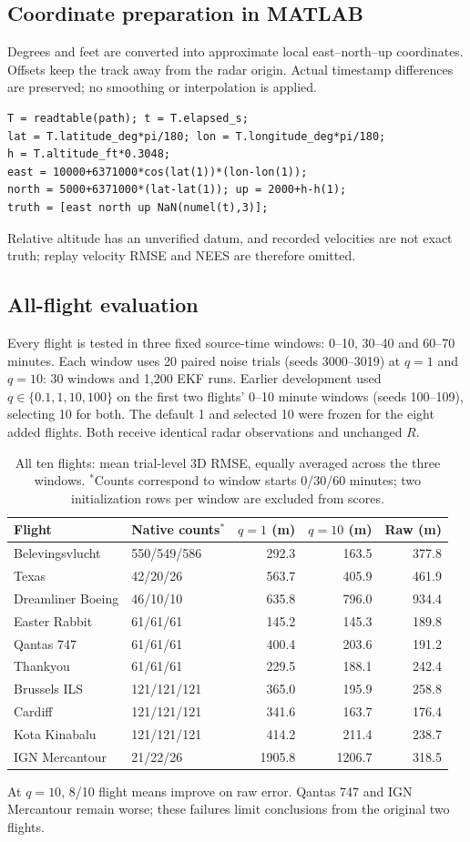 \documentclass[12pt,a4paper]{article}
\begin{document}
\subsection{Coordinate preparation in MATLAB}
Degrees and feet are converted into approximate local east--north--up coordinates. Offsets keep the track away from the radar origin. Actual timestamp differences are preserved; no smoothing or interpolation is applied.
\begin{lstlisting}
T = readtable(path); t = T.elapsed_s;
lat = T.latitude_deg*pi/180; lon = T.longitude_deg*pi/180;
h = T.altitude_ft*0.3048;
east = 10000+6371000*cos(lat(1))*(lon-lon(1));
north = 5000+6371000*(lat-lat(1)); up = 2000+h-h(1);
truth = [east north up NaN(numel(t),3)];
\end{lstlisting}
Relative altitude has an unverified datum, and recorded velocities are not exact truth; replay velocity RMSE and NEES are therefore omitted.

\subsection{All-flight evaluation}
Every flight is tested in three fixed source-time windows: 0--10, 30--40 and 60--70 minutes. Each window uses 20 paired noise trials (seeds 3000--3019) at $q=1$ and $q=10$: 30 windows and 1,200 EKF runs. Earlier development used $q\in\{0.1,1,10,100\}$ on the first two flights' 0--10 minute windows (seeds 100--109), selecting 10 for both. The default 1 and selected 10 were frozen for the eight added flights. Both receive identical radar observations and unchanged $R$.
\begin{table}[H]\centering\footnotesize
\setlength{\tabcolsep}{4pt}
\begin{tabular}{llrrr}\toprule
Flight & Native counts$^*$ & $q=1$ (m) & $q=10$ (m) & Raw (m)\\\midrule
Belevingsvlucht & 550/549/586 & 292.3 & 163.5 & 377.8 \\
Texas & 42/20/26 & 563.7 & 405.9 & 461.9 \\
Dreamliner Boeing & 46/10/10 & 635.8 & 796.0 & 934.4 \\
Easter Rabbit & 61/61/61 & 145.2 & 145.3 & 189.8 \\
Qantas 747 & 61/61/61 & 400.4 & 203.6 & 191.2 \\
Thankyou & 61/61/61 & 229.5 & 188.1 & 242.4 \\
Brussels ILS & 121/121/121 & 365.0 & 195.9 & 258.8 \\
Cardiff & 121/121/121 & 341.6 & 163.7 & 176.4 \\
Kota Kinabalu & 121/121/121 & 414.2 & 211.4 & 238.7 \\
IGN Mercantour & 21/22/26 & 1905.8 & 1206.7 & 318.5 \\
\bottomrule\end{tabular}
\caption{All ten flights: mean trial-level 3D RMSE, equally averaged across the three windows. $^*$Counts correspond to window starts 0/30/60 minutes; two initialization rows per window are excluded from scores.}
\end{table}
At $q=10$, 8/10 flight means improve on raw error. Qantas 747 and IGN Mercantour remain worse; these failures limit conclusions from the original two flights.
\clearpage
\end{document}
